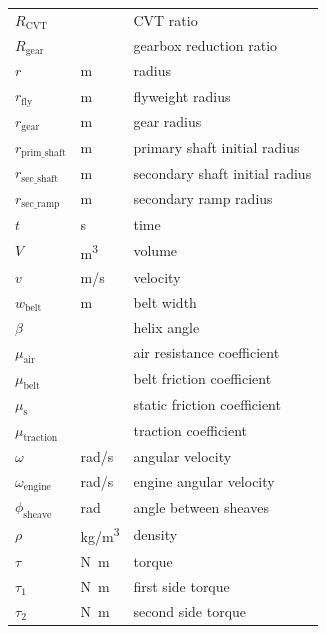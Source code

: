 \documentclass[12pt]{article}
\begin{document}
\begin{longtable*}{l l p{12cm}}
$R_{\text{CVT}}$ & \si[per-mode=symbol] {} & CVT ratio \\
$R_{\text{gear}}$ & \si[per-mode=symbol] {} & gearbox reduction ratio \\
$r$ & \si[per-mode=symbol] {\metre} & radius \\
$r_{\text{fly}}$ & \si[per-mode=symbol] {\metre} & flyweight radius \\
$r_{\text{gear}}$ & \si[per-mode=symbol] {\metre} & gear radius \\
$r_{\text{prim\_shaft}}$ & \si[per-mode=symbol] {\metre} & primary shaft initial radius \\
$r_{\text{sec\_shaft}}$ & \si[per-mode=symbol] {\metre} & secondary shaft initial radius \\
$r_{\text{sec\_ramp}}$ & \si[per-mode=symbol] {\metre} & secondary ramp radius \\
$t$ & \si[per-mode=symbol] {\second} & time \\
$V$ & \si[per-mode=symbol] {\metre\cubed} & volume \\
$v$ & \si[per-mode=symbol] {\metre\per\second} & velocity \\
$w_{\text{belt}}$ & \si[per-mode=symbol] {\metre} & belt width \\
$\beta$ & \si[per-mode=symbol] {} & helix angle \\
$\mu_{\text{air}}$ & \si[per-mode=symbol] {} & air resistance coefficient \\
$\mu_{\text{belt}}$ & \si[per-mode=symbol] {} & belt friction coefficient \\
$\mu_{\text{s}}$ & \si[per-mode=symbol] {} & static friction coefficient \\
$\mu_{\text{traction}}$ & \si[per-mode=symbol] {} & traction coefficient \\
$\omega$ & \si[per-mode=symbol] {\radian\per\second} & angular velocity \\
$\omega_{\text{engine}}$ & \si[per-mode=symbol] {\radian\per\second} & engine angular velocity \\
$\phi_{\text{sheave}}$ & \si[per-mode=symbol] {\radian} & angle between sheaves \\
$\rho$ & \si[per-mode=symbol] {\kilogram\per\metre\cubed} & density \\
$\tau$ & \si[per-mode=symbol] {\newton\metre} & torque \\
$\tau_1$ & \si[per-mode=symbol] {\newton\metre} & first side torque \\
$\tau_2$ & \si[per-mode=symbol] {\newton\metre} & second side torque \\

\end{longtable*}
\end{document}
